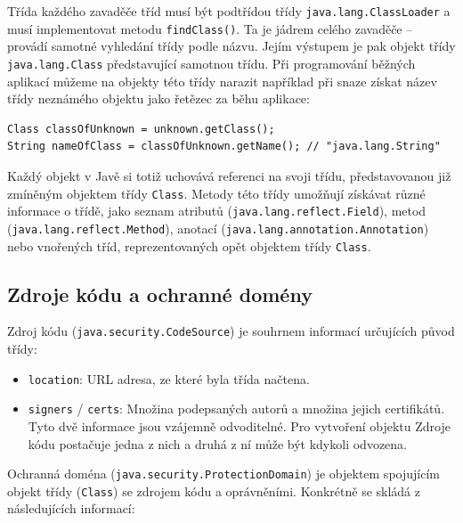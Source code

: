 Třída každého zavaděče tříd musí být podtřídou třídy {\tt java.lang.ClassLoader} a musí implementovat metodu {\tt findClass()}. Ta je jádrem celého zavaděče -- provádí samotné vyhledání třídy podle názvu. Jejím výstupem je pak objekt třídy {\tt java.lang.Class} představující samotnou třídu. Při programování běžných aplikací můžeme na objekty této třídy narazit například při snaze získat název třídy neznámého objektu jako řetězec za běhu aplikace: \cite{refClassLoader}

\begin{lstlisting}[caption=Získávání názvu třídy neznámého objektu, label=getClassName]
Class classOfUnknown = unknown.getClass();
String nameOfClass = classOfUnknown.getName(); // "java.lang.String"
\end{lstlisting}

Každý objekt v Javě si totiž uchovává referenci na svoji třídu, představovanou již zmíněným objektem třídy {\tt Class}. Metody této třídy umožňují získávat různé informace o třídě, jako seznam atributů ({\tt java.lang.reflect.Field}), metod ({\tt java.lang.reflect.Method}), anotací ({\tt java.lang.annotation.Annotation}) nebo vnořených tříd, reprezentovaných opět objektem třídy {\tt Class}.

\subsection{Zdroje kódu a ochranné domény}

Zdroj kódu ({\tt java.security.CodeSource}) je souhrnem informací určujících původ třídy: \cite{sourceCodeSource}

\begin{itemize}
  \item {\tt location}: URL adresa, ze které byla třída načtena.
  \item {\tt signers} / {\tt certs}: Množina podepsaných autorů a množina jejich certifikátů. Tyto dvě informace jsou vzájemně odvoditelné. Pro vytvoření objektu Zdroje kódu postačuje jedna z nich a druhá z ní může být kdykoli odvozena.
\end{itemize}

Ochranná doména ({\tt java.security.ProtectionDomain}) je objektem spojujícím objekt třídy ({\tt Class}) se zdrojem kódu a oprávněními. Konkrétně se skládá z následujících informací: \cite{sourceProtectionDomain}

